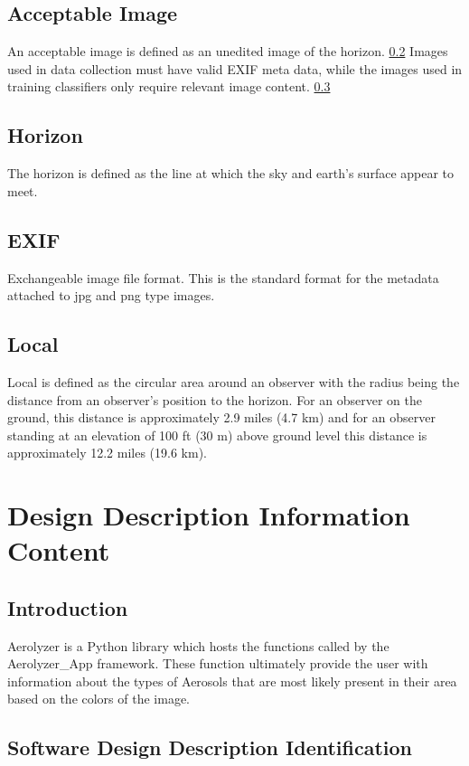 \documentclass[onecolumn, draftclsnofoot,10pt, compsoc]{IEEEtran}
\begin{document}
\begin{singlespace}
	\subsection{Acceptable Image}\label{def:accImg}
		An acceptable image is defined as an unedited image of the horizon. \ref{def:horizon}
		Images used in data collection must have valid EXIF meta data, while the images used in training classifiers only require relevant image content. \ref{def:exif}
	
	\subsection{Horizon}\label{def:horizon}
		The horizon is defined as the line at which the sky and earth's surface appear to meet.
	
	\subsection{EXIF}\label{def:exif}
		Exchangeable image file format.
		This is the standard format for the metadata attached to jpg and png type images.
	
	\subsection{Local}\label{def:local}
		Local is defined as the circular area around an observer with the radius being the distance from an observer's position to the horizon.
		For an observer on the ground, this distance is approximately 2.9 miles (4.7 km) and for an observer standing at an elevation of 100 ft (30 m) above ground level this distance is approximately 12.2 miles (19.6 km).

\section{Design Description Information Content}
	\subsection{Introduction}
		Aerolyzer is a Python library which hosts the functions called by the Aerolyzer\_App framework.
		These function ultimately provide the user with information about the types of Aerosols that are most likely present in their area based on the colors of the image.
    \subsection{Software Design Description Identification}

\end{singlespace}
\end{document}
